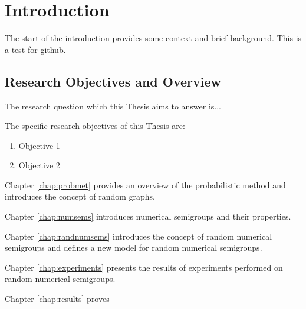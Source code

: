 \chapter{Introduction}\label{chap:intro}

The start of the introduction provides some context and brief background.
This is a test for github.
\section{Research Objectives and Overview}


The research question which this Thesis aims to answer is...


The specific research objectives of this Thesis are:

\begin{enumerate}
\item Objective 1
\item Objective 2
\end{enumerate}

Chapter \ref{chap:probmet} provides an overview of the probabilistic method and introduces the concept of random graphs. \par
Chapter \ref{chap:numsems} introduces numerical semigroups and their properties. \par
Chapter \ref{chap:randnumsems} introduces the concept of random numerical semigroups and defines a new model for random numerical semigroups. \par
Chapter \ref{chap:experiments} presents the results of experiments performed on random numerical semigroups. \par
Chapter \ref{chap:results} proves 